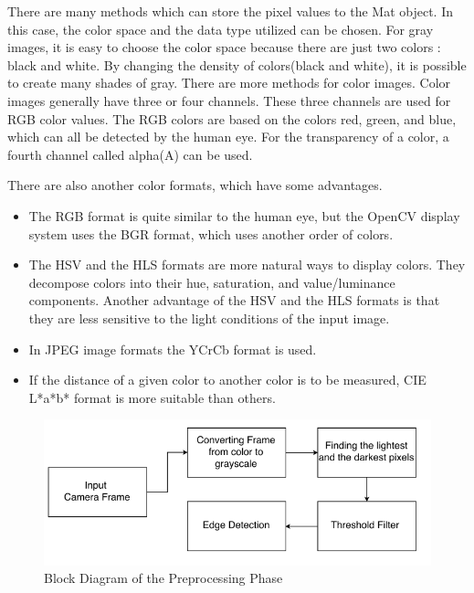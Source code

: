 There are many methods which can store the pixel values to the Mat object. In this case, the color space and the data type utilized can be chosen. For gray images, it is easy to choose the color space because there are just two colors : black and white. By changing the density of colors(black and white), it is possible to create many shades of gray. There are more methods for color images. Color images generally have three or four channels. These three channels are used for RGB color values. The RGB colors are based on the colors red, green, and blue, which can all be detected by the human eye. For the transparency of a color, a fourth channel called alpha(A) can be used.

There are also another color formats, which have some advantages\cite{OpenCV_Mat}. 

\begin{itemize}

\item The RGB format is quite similar to the human eye, but the OpenCV display system uses the BGR format, which uses another order of colors.

\item The HSV and the HLS formats are more natural ways to display colors. They decompose colors into their hue, saturation, and value/luminance components. Another advantage of the HSV and the HLS formats is that they are less sensitive to the light conditions of the input image.

\item In JPEG image formats the YCrCb format is used.

\item If the distance of a given color to another color is to be measured, CIE L*a*b* format is more suitable than others.

\end{itemize}




\begin{figure}[H]
 \centering
  \includegraphics[width=1\textwidth]{./Bilder/Presprocessing_Figure.png}	
  \caption{Block Diagram of the Preprocessing Phase}
  \label{fig:Block_Diagram_of_the_Preprocessing_Part}
\end{figure}





